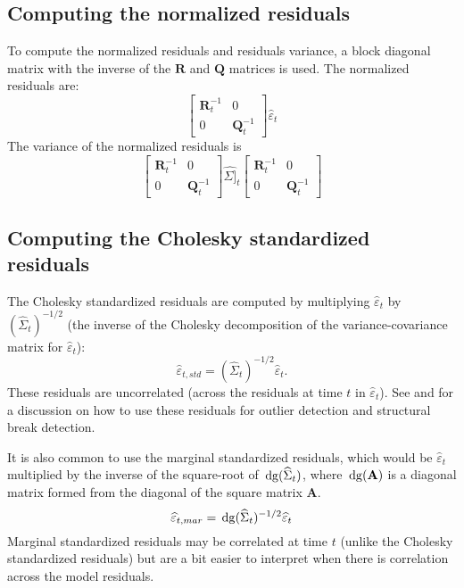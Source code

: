 \documentclass[]{article}
\def\AA{\mbox{$\mathbf A$}}	\def\aa{\mbox{$\mathbf a$}}
\def\QQ{\mbox{$\mathbf Q$}}	 \def\qq{\mbox{$\mathbf q$}} \def\Qb{\mbox{$\mathbf G$}}  \def\Qm{\mathbb{Q}}
\def\RR{\mbox{$\mathbf R$}}	 \def\rr{\mbox{$\mathbf r$}} \def\Rb{\mbox{$\mathbf H$}}	\def\Rm{\mathbb{R}}
\def\dg{\,\textup{\textrm{dg}}}
\begin{document}
\subsection{Computing the normalized residuals}

To compute the normalized residuals and residuals variance, a block diagonal matrix with the inverse of the $\RR$ and $\QQ$ matrices is used. The normalized residuals are:
\begin{equation}
\begin{bmatrix}\RR^{-1}_t&0\\0&\QQ^{-1}_t\end{bmatrix} \widehat{\varepsilon}_t
\end{equation}
The variance of the normalized residuals is
\begin{equation}
\begin{bmatrix}\RR^{-1}_t&0\\0&\QQ^{-1}_t\end{bmatrix} \widehat{\Sigma]}_t \begin{bmatrix}\RR^{-1}_t&0\\0&\QQ^{-1}_t\end{bmatrix}
\end{equation}

\subsection{Computing the Cholesky standardized residuals}

The Cholesky standardized residuals are computed by multiplying $\widehat{\varepsilon}_t$ by $(\widehat{\Sigma}_t)^{-1/2}$ (the inverse of the Cholesky decomposition of  the variance-covariance matrix for $\widehat{\varepsilon}_t$):
\begin{equation}\label{eq:std.resid}
\widehat{\varepsilon}_{t, std} = (\widehat{\Sigma}_t)^{-1/2}\widehat{\varepsilon}_t .
\end{equation}
These residuals are uncorrelated (across the residuals at time $t$ in $\widehat{\varepsilon}_t$).  See \citet{HarveyKoopman1992} and \citet[section V]{Harveyetal1998} for a discussion on how to use these residuals for outlier detection and structural break detection.

It is also common to use the marginal standardized residuals, which would be $\widehat{\varepsilon}_t$ multiplied by the inverse of the square-root of $\dg(\widehat{\Sigma}_t)$, where $\dg(\AA)$ is a diagonal matrix formed from the diagonal of the square matrix $\AA$.
\begin{equation}
\widehat{\varepsilon}_{t, mar} = \dg(\widehat{\Sigma}_t)^{-1/2}\widehat{\varepsilon}_t 
\end{equation}
Marginal standardized residuals may be correlated at time $t$ (unlike the Cholesky standardized residuals) but are a bit easier to interpret when there is correlation across the model residuals. 
\end{document}
